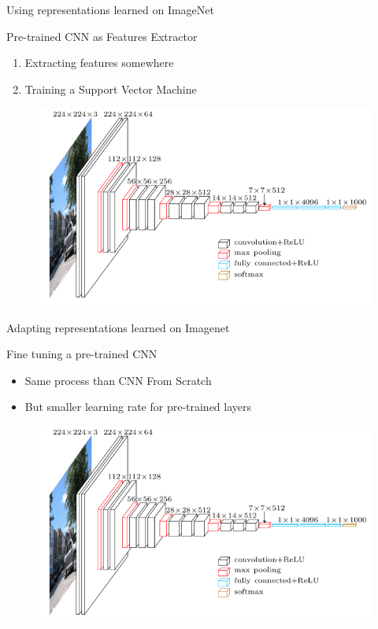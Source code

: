 \begin{frame}{Using representations learned on ImageNet}
	
	\begin{block}{\small Pre-trained CNN as Features Extractor}
	\begin{enumerate}
		\item Extracting features somewhere
		\item Training a Support Vector Machine
	\end{enumerate}
	\end{block}
	
	\begin{figure}[h]
		\centering
		\includegraphics[width=.70\linewidth]{images/vgg16.png}
	\end{figure}

\end{frame}


\begin{frame}{Adapting representations learned on Imagenet}

	\begin{block}{\small Fine tuning a pre-trained CNN}
	\begin{itemize}
		\item Same process than CNN From Scratch
		\item But smaller learning rate for pre-trained layers
	\end{itemize}
	\end{block}
	
	\begin{figure}[h]
		\centering
		\includegraphics[width=.79\linewidth]{images/vgg16.png}
	\end{figure}

\end{frame}

